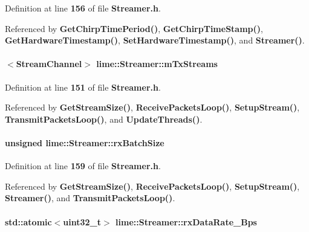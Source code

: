 Definition at line {\bf 156} of file {\bf Streamer.\+h}.



Referenced by {\bf Get\+Chirp\+Time\+Period()}, {\bf Get\+Chirp\+Time\+Stamp()}, {\bf Get\+Hardware\+Timestamp()}, {\bf Set\+Hardware\+Timestamp()}, and {\bf Streamer()}.

\paragraph[{m\+Tx\+Streams}]{$<${\bf Stream\+Channel}$>$ lime\+::\+Streamer\+::m\+Tx\+Streams}\label{classlime_1_1Streamer_a76ba9dc33e6bdccbda735faa6953c180}


Definition at line {\bf 151} of file {\bf Streamer.\+h}.



Referenced by {\bf Get\+Stream\+Size()}, {\bf Receive\+Packets\+Loop()}, {\bf Setup\+Stream()}, {\bf Transmit\+Packets\+Loop()}, and {\bf Update\+Threads()}.

\paragraph[{rx\+Batch\+Size}]{\setlength{\rightskip}{0pt plus 5cm}unsigned lime\+::\+Streamer\+::rx\+Batch\+Size}\label{classlime_1_1Streamer_ab9836edafedfa653415ca6ae2d8acd2e}


Definition at line {\bf 159} of file {\bf Streamer.\+h}.



Referenced by {\bf Get\+Stream\+Size()}, {\bf Receive\+Packets\+Loop()}, {\bf Setup\+Stream()}, {\bf Streamer()}, and {\bf Transmit\+Packets\+Loop()}.

\paragraph[{rx\+Data\+Rate\+\_\+\+Bps}]{\setlength{\rightskip}{0pt plus 5cm}std\+::atomic$<$uint32\+\_\+t$>$ lime\+::\+Streamer\+::rx\+Data\+Rate\+\_\+\+Bps}\label{classlime_1_1Streamer_adc125cfae72d5e94f775a3f5e3fdd2e9}


